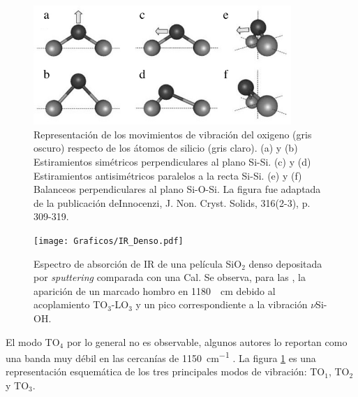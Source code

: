 		 		 \begin{figure}[!t]
						\begin{center}
						\includegraphics[width=0.87\textwidth]{Imagenes/modos-infra.jpg}
						\caption[Modos de vibración Si-O-Si]{Representación de los movimientos de vibración del oxigeno (gris oscuro) respecto de los átomos de silicio (gris claro). (a) y (b) Estiramientos simétricos perpendiculares al plano Si-Si. (c) y (d) Estiramientos antisimétricos paralelos a la recta Si-Si. (e) y (f) Balanceos perpendiculares al plano Si-O-Si. La figura fue adaptada de la publicación deInnocenzi, J. Non. Cryst. Solids, 316(2-3), p. 309-319.}
						\label{fig:modos-ir}
						\vspace*{-3mm}
						\end{center}
						\end{figure}

				
		  \begin{figure}[!b]
						\begin{center}
						\texttt{[image: Graficos/IR\_Denso.pdf]}
						\caption[FTIR SiO$_2$ denso y SiO$_2$ mesoporoso.]{Espectro de absorción de IR de una película SiO$_2$ denso depositada por \textit{sputtering }comparada con una Cal\pdmF. Se observa, para las \pdm, la aparición de un marcado hombro en \SI{1180}{\per\cm} debido al acoplamiento TO$_3$-LO$_3$ y un pico correspondiente a la vibración $\nu$Si-OH.}
						\label{fig:IR-denso}
						\end{center}
						\end{figure}

		 El modo TO$_4$ por lo general no es observable, algunos autores lo reportan como una banda muy débil en las cercanías de \SI{1150}{\cm^{-1}} \cite{Pai1986,Grosse1986}. La figura \ref{fig:modos-ir} es una representación esquemática de los tres principales modos de vibración: TO$_1$, TO$_2$ y TO$_3$.

